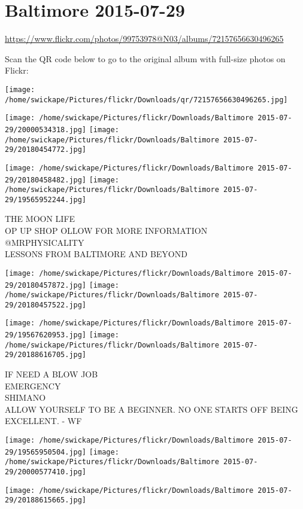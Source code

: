 \documentclass[10pt,letterpaper]{article}
\title{}
\author{}
\date{}
\begin{document}
\section*{Baltimore 2015-07-29}

\url{https://www.flickr.com/photos/99753978@N03/albums/72157656630496265}

Scan the QR code below to go to the original album with full-size photos on Flickr:

\texttt{[image: /home/swickape/Pictures/flickr/Downloads/qr/72157656630496265.jpg]}
\pagebreak

\texttt{[image: /home/swickape/Pictures/flickr/Downloads/Baltimore 2015-07-29/20000534318.jpg]}
\texttt{[image: /home/swickape/Pictures/flickr/Downloads/Baltimore 2015-07-29/20180454772.jpg]}

\texttt{[image: /home/swickape/Pictures/flickr/Downloads/Baltimore 2015-07-29/20180458482.jpg]}
\texttt{[image: /home/swickape/Pictures/flickr/Downloads/Baltimore 2015-07-29/19565952244.jpg]}

THE MOON LIFE\\
OP UP SHOP OLLOW FOR MORE INFORMATION\\
@MRPHYSICALITY\\
LESSONS FROM BALTIMORE AND BEYOND
\pagebreak

\texttt{[image: /home/swickape/Pictures/flickr/Downloads/Baltimore 2015-07-29/20180457872.jpg]}
\texttt{[image: /home/swickape/Pictures/flickr/Downloads/Baltimore 2015-07-29/20180457522.jpg]}

\texttt{[image: /home/swickape/Pictures/flickr/Downloads/Baltimore 2015-07-29/19567620953.jpg]}
\texttt{[image: /home/swickape/Pictures/flickr/Downloads/Baltimore 2015-07-29/20188616705.jpg]}

IF NEED A BLOW JOB\\
EMERGENCY\\
SHIMANO\\
ALLOW YOURSELF TO BE A BEGINNER.  NO ONE STARTS OFF BEING EXCELLENT.  {-} WF
\pagebreak

\texttt{[image: /home/swickape/Pictures/flickr/Downloads/Baltimore 2015-07-29/19565950504.jpg]}
\texttt{[image: /home/swickape/Pictures/flickr/Downloads/Baltimore 2015-07-29/20000577410.jpg]}

\vspace{0.25in}
\texttt{[image: /home/swickape/Pictures/flickr/Downloads/Baltimore 2015-07-29/20188615665.jpg]}
\end{document}
